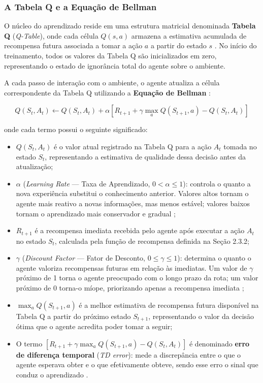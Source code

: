 \documentclass[
    12pt,                %
    openright,           %
    oneside,             %
    a4paper,             %
    english,             %
    brazil               %
]{abntex2}
\begin{document}
\subsubsection*{A Tabela Q e a Equação de Bellman}

O núcleo do aprendizado reside em uma estrutura matricial denominada \textbf{Tabela
Q} (\textit{Q-Table}), onde cada célula $Q(s, a)$ armazena a estimativa acumulada
de recompensa futura associada a tomar a ação $a$ a partir do estado $s$
\cite{Sutton2018}. No início do treinamento, todos os valores da Tabela Q são
inicializados em zero, representando o estado de ignorância total do agente sobre
o ambiente.

A cada passo de interação com o ambiente, o agente atualiza a célula correspondente
da Tabela Q utilizando a \textbf{Equação de Bellman} \cite{Sutton2018}:

$$ Q(S_t, A_t) \leftarrow Q(S_t, A_t) + \alpha \left[ R_{t+1} + \gamma
\max_{a} Q(S_{t+1}, a) - Q(S_t, A_t) \right] $$

onde cada termo possui o seguinte significado:

\begin{itemize}
    \item $Q(S_t, A_t)$ é o valor atual registrado na Tabela Q para a ação $A_t$
    tomada no estado $S_t$, representando a estimativa de qualidade dessa decisão
    antes da atualização;

    \item $\alpha$ (\textit{Learning Rate} --- Taxa de Aprendizado, $0 < \alpha
    \leq 1$): controla o quanto a nova experiência substitui o conhecimento
    anterior. Valores altos tornam o agente mais reativo a novas informações, mas
    menos estável; valores baixos tornam o aprendizado mais conservador e gradual
    \cite{Sutton2018};

    \item $R_{t+1}$ é a recompensa imediata recebida pelo agente após executar a
    ação $A_t$ no estado $S_t$, calculada pela função de recompensa definida na
    Seção 2.3.2;

    \item $\gamma$ (\textit{Discount Factor} --- Fator de Desconto, $0 \leq \gamma
    \leq 1$): determina o quanto o agente valoriza recompensas futuras em relação
    às imediatas. Um valor de $\gamma$ próximo de 1 torna o agente preocupado com
    o longo prazo da rota; um valor próximo de 0 torna-o míope, priorizando apenas
    a recompensa imediata \cite{Sutton2018};

    \item $\max_{a} Q(S_{t+1}, a)$ é a melhor estimativa de recompensa futura
    disponível na Tabela Q a partir do próximo estado $S_{t+1}$, representando o
    valor da decisão ótima que o agente acredita poder tomar a seguir;

    \item O termo $\left[ R_{t+1} + \gamma \max_{a} Q(S_{t+1}, a) - Q(S_t, A_t)
    \right]$ é denominado \textbf{erro de diferença temporal} (\textit{TD error}):
    mede a discrepância entre o que o agente esperava obter e o que efetivamente
    obteve, sendo esse erro o sinal que conduz o aprendizado \cite{Sutton2018}.
\end{itemize}
\end{document}
